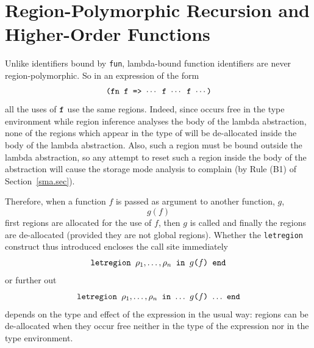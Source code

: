 \documentclass[12pt]{book}
\begin{document}
\section{Region-Polymorphic Recursion and Higher-Order Functions}
Unlike identifiers bound by {\tt fun}, lambda-bound function identifiers
are never region-polymorphic. So in an expression of the form
$$\hbox{\tt (fn f => $\cdots$ f $\cdots$ f $\cdots$)}$$
all the uses of $\hbox{\tt f}$ use the same regions. Indeed, since 
occurs free in the type environment while region inference analyses the body of the lambda abstraction,
none of the regions which appear in the type of  will be de-allocated inside the body
of the lambda abstraction. Also, such a region
must be bound outside the lambda abstraction, so
any attempt to 
reset such a region inside the body of the abstraction
will cause the storage mode analysis to complain (by Rule (B1) of Section~\ref{sma.sec}).

Therefore, when a function $f$ is passed as argument to another function, $g$,
$$g(f)$$
first regions are allocated for the use of $f$, then $g$ is called and finally
the regions are de-allocated (provided they are not global regions). 
Whether the {\tt letregion} construct thus introduced encloses the call site
immediately
$$\hbox{\tt letregion $\rho_1,\ldots,\rho_n$ in $g$($f$) end}$$
or further out
$$\hbox{\tt letregion $\rho_1,\ldots,\rho_n$ in $\ldots$ $g$($f$) $\ldots$  end}$$
depends on the type and effect of the expression  in the usual way:
regions can be de-allocated when they   occur free neither in the type
of the expression nor in the type environment.
\end{document}
